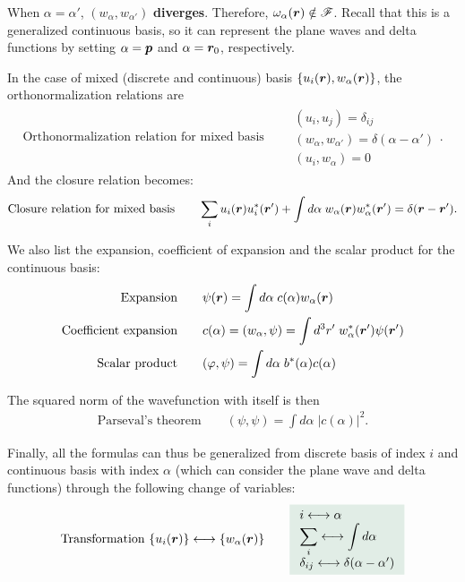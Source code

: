 When $\alpha=\alpha'$, $(w_\alpha,w_{\alpha'})$ \textbf{diverges}. Therefore, $\omega_\alpha(\bm{r})\notin\mathscr{F}$. Recall that this is a generalized continuous basis,
so it can represent the plane waves and delta functions by setting $\alpha=\bm{p}$ and $\alpha=\bm{r}_0$, respectively.

In the case of mixed (discrete and continuous) basis $\{u_i(\bm{r}),w_\alpha(\bm{r})\}$, the orthonormalization relations are
\begin{align}
    \text{Orthonormalization relation for mixed basis}\qquad
    \begin{array}{l}
        (u_i,u_j)=\delta_{ij}\\
        (w_\alpha,w_{\alpha'})=\delta(\alpha-\alpha')\\
        (u_i,w_\alpha)=0
    \end{array}.
\end{align}
And the closure relation becomes:
\begin{align}
    \text{Closure relation for mixed basis}\qquad\sum_iu_i(\bm{r})u_i^*(\bm{r}')+\int d\alpha\;w_\alpha(\bm{r})w^*_\alpha(\bm{r}')=\delta(\bm{r}-\bm{r}').
\end{align}

We also list the expansion, coefficient of expansion and the scalar product for the continuous basis:
\begin{align}
    \text{Expansion}&\qquad\psi(\bm{r})=\int d\alpha\;c(\alpha)w_\alpha(\bm{r})\\
    \text{Coefficient expansion}&\qquad c(\alpha)=(w_\alpha,\psi)=\int d^3r'\;w^*_\alpha(\bm{r}')\psi(\bm{r}')\\
    \text{Scalar product}&\qquad(\varphi,\psi)=\int d\alpha\;b^*(\alpha)c(\alpha)
\end{align}

The squared norm of the wavefunction with itself is then
\begin{align}
    \text{Parseval's theorem}\qquad(\psi,\psi)=\int d\alpha\;|c(\alpha)|^2.
\end{align}

Finally, all the formulas can thus be generalized from discrete basis of index $i$ and continuous basis with index $\alpha$ (which can consider 
the plane wave and delta functions) through the following change of variables:
\begin{align}
    \text{Transformation $\{u_i(\bR)\}\longleftrightarrow\{w_{\alpha}(\bR)\}$}\qquad
    \highlight{\begin{array}{l}
        i\longleftrightarrow\alpha\\
        \displaystyle\sum_i\longleftrightarrow\int d\alpha\\
        \delta_{ij}\longleftrightarrow\delta(\alpha-\alpha')
    \end{array}}
\end{align}



